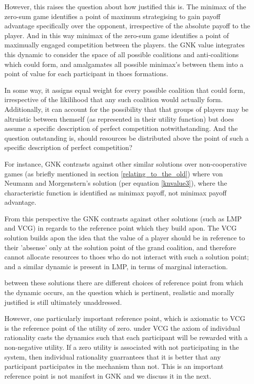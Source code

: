 However, this raises the question about how justified this is.
The minimax of the zero-sum game identifies a point of maximum strategising to gain payoff advantage specifically over the opponent, irrespective of the absolute payoff to the player.
And in this way minimax of the zero-sum game identifies a point of maximually engaged competition between the players.
the GNK value integrates this dynamic to consider the space of all possible coalitions and anti-coalitions which could form, and amalgamates all possible minimax's between them into a point of value for each participant in thoes formations.

In some way, it assigns equal weight for every possible coalition that could form, irrespective of the likilihood that any such coalition would actually form.
Additionally, it can account for the possibility that that groups of players may be altruistic between themself (as represented in their utility function) but does assume a specific description of perfect competition notwithstanding.
And the question outstanding is, should resources be distributed above the point of such a specific description of perfect competition?

For instance, GNK contrasts against other similar solutions over non-cooperative games (as briefly mentioned in section \ref{relating_to_the_old}) where von Neumann and Morgenstern's solution (per equation \ref{knvalue3}), where the characteristic function is identified as minimax payoff, not minimax payoff advantage.

From this perspective the GNK contrasts against other solutions (such as LMP and VCG) in regards to the reference point which they build apon.
The VCG solution builds apon the idea that the value of a player should be in reference to their 'absense' only at the solution point of the grand coalition, and therefore cannot allocate resources to thoes who do not interact with such a solution point; and a similar dynamic is present in LMP, in terms of marginal interaction.

between these solutions there are different choices of reference point from which the dynamic occurs, an the question which is pertinent, realistic and morally justified is still ultimately unaddressed.

However, one particularly important reference point, which is axiomatic to VCG is the reference point of the utility of zero.
under VCG the axiom of individual rationality casts the dynamics such that each participant will be rewarded with a non-negative utility.
If a zero utility is associated with not participating in the system, then individual rationality guarrantees that it is better that any participant participates in the mechanism than not.
This is an important reference point is not manifest in GNK and we discuss it in the next.

